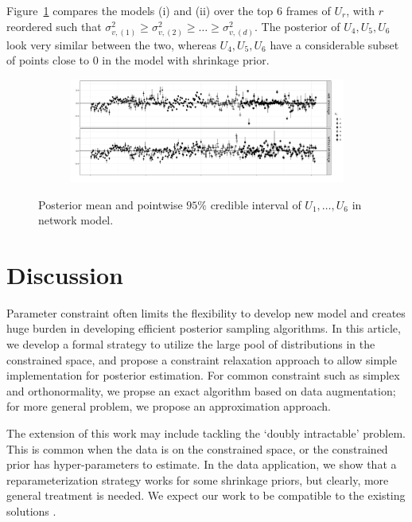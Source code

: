\documentclass[10pt,fleqn]{article}
\DeclareMathOperator{\1}{\mathbbm{1}}
\begin{document}
Figure~\ref{network_model_basis} compares the models (i) and (ii) over the top $6$ frames of $U_r$, with  $r$
 reordered such that $\sigma^2_{v,(1)}\ge \sigma^2_{v,(2)}\ge \ldots \ge \sigma^2_{v,(d)}$. The posterior of $U_4,U_5,U_6$ look very similar between the two, whereas $U_4,U_5,U_6$ have a considerable subset
of points close to 0 in the model with shrinkage prior.
\textsl{}
\begin{figure}[H]
\begin{subfigure}[b]{1\textwidth}
\includegraphics[width=1\textwidth]{network_factor.pdf}

\end{subfigure}
\caption{Posterior mean and pointwise $95\%$ credible interval of $U_1,\ldots,
U_6$ in network model. \label{network_model_basis}}
\end{figure}




\section{Discussion}

Parameter constraint often limits the flexibility to develop new model and creates huge burden in developing efficient posterior sampling algorithms. In this article, we develop a formal strategy to utilize the large pool of distributions in the constrained space, and propose a constraint relaxation approach to allow simple implementation for posterior estimation. For common constraint such as simplex and orthonormality, we propse an exact algorithm based on data augmentation; for more general problem, we propose an approximation approach.

The extension of this work may include tackling the  `doubly intractable' problem. This is common when the data is on the constrained space, or the constrained prior has hyper-parameters to estimate. In the data application, we show that a reparameterization strategy works for some shrinkage priors, but clearly, 
more general treatment is needed. We expect our work to be compatible to the existing solutions \citep{murray2012mcmc,rao2016data, stoehr2017noisy}.




\end{document}
